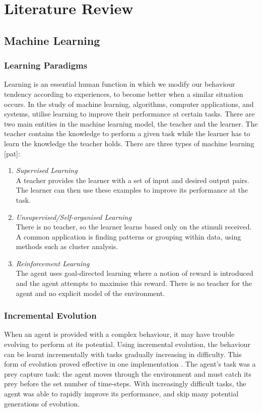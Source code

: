 \documentclass[12pt,a4paper]{article}
\begin{document}
\section{Literature Review}
\subsection{Machine Learning}
\subsubsection{Learning Paradigms}
Learning is an essential human function in which we modify our behaviour tendency according to experiences, to become better when a similar situation occurs. In the study of machine learning, algorithms, computer applications, and systems, utilise learning to improve their performance at certain tasks. There are two main entities in the machine learning model, the teacher and the learner. The teacher contains the knowledge to perform a given task while the learner has to learn the knowledge the teacher holds. \cite{swarmann} There are three types of machine learning [pat]:
\begin{enumerate}
\item \emph{Supervised Learning}\\
A teacher provides the learner with a set of input and desired output pairs. The learner can then use these examples to improve its performance at the task.
\item \emph{Unsupervised/Self-organised Learning}\\
There is no teacher, so the learner learns based only on the stimuli received. A common application is finding patterns or grouping within data, using methods such as cluster analysis.
\item \emph{Reinforcement Learning}\\
The agent uses goal-directed learning where a notion of reward is introduced and the agent attempts to maximise this reward. There is no teacher for the agent and no explicit model of the environment.
\end{enumerate}

\subsubsection{Incremental Evolution}
When an agent is provided with a complex behaviour, it may have trouble evolving to perform at its potential. Using incremental evolution, the behaviour can be learnt incrementally with tasks gradually increasing in difficulty. This form of evolution proved effective in one implementation \cite{incre}. The agent's task was a prey capture task: the agent moves through the environment and must catch its prey before the set number of time-steps. With increasingly difficult tasks, the agent was able to rapidly improve its performance, and skip many potential generations of evolution.
\end{document}

